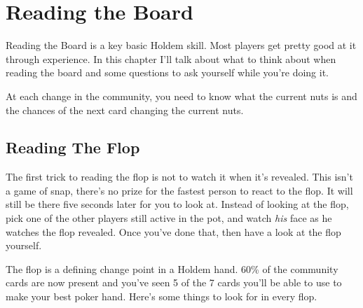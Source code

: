 \chapter{Reading the Board}

Reading the Board is a key basic Holdem skill. Most players get
pretty good at it through experience. In this chapter I'll talk about
what to think about when reading the board and some questions to ask
yourself while you're doing it.

At each change in the community, you need to know what the current
nuts is and the chances of the next card changing the current nuts.

\section{Reading The Flop}

The first trick to reading the flop is not to watch it when it's
revealed. This isn't a game of snap, there's no prize for the fastest
person to react to the flop. It will still be there five seconds later
for you to look at. Instead of looking at the flop, pick one of the
other players still active in the pot, and watch \textit{his} face as
he watches the flop revealed. Once you've done that, then have a look
at the flop yourself.

The flop is a defining change point in a Holdem hand. 60\% of the
community cards are now present and you've seen 5 of the 7 cards
you'll be able to use to make your best poker hand. Here's some things
to look for in every flop.

